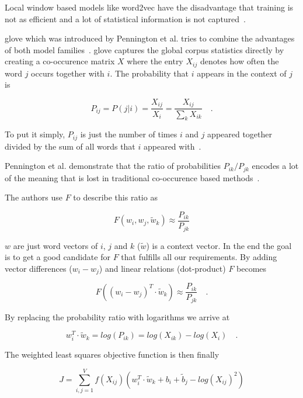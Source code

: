 Local window based models like word2vec have the disadvantage that training is not as efficient and a lot of statistical information is not captured~\cite{Pennington2014a}. 
\medskip

\gls{glove} which was introduced by Pennington et al. tries to combine the advantages of both model families~\cite{Pennington2014a}. \gls{glove} captures the global corpus statistics directly by creating a co-occurence matrix $X$ where the entry $X_{ij}$ denotes how often the word $j$ occurs together with $i$. The probability that $i$ appears in the context of $j$ is 

\begin{equation}
	P_{ij}=P(j|i)=\frac{X_{ij}}{X_i}=\frac{X_{ij}}{\sum_k X_{ik}}\quad.
\end{equation}

To put it simply, $P_{ij}$ is just the number of times $i$ and $j$ appeared together divided by the sum of all words that $i$ appeared with~\cite{Pennington2014a}.

Pennington et al. demonstrate that the ratio of probabilities $P_{ik} / P_{jk}$  encodes a lot of the meaning that is lost in traditional co-occurence based methods~\cite{Pennington2014a}.
\medskip

The authors use $F$ to describe this ratio as

\begin{equation}
	F(w_i, w_j, \widetilde{w}_k) \approx \frac{P_{ik}}{P_{jk}}
\end{equation}

$w$ are just word vectors of $i$, $j$ and $k$ {($\widetilde{w}$)} is a context vector. In the end the goal is to get a good candidate for $F$ that fulfills all our requirements. By adding vector differences {($w_i - w_j$)} and linear relations {(dot-product)} $F$ becomes

\begin{equation}
	F((w_i - w_j)^T \cdot \widetilde{w}_k) \approx \frac{P_{ik}}{P_{jk}} \quad .
\end{equation}

By replacing the probability ratio with logarithms we arrive at

\begin{equation}
	w_i^T \cdot \widetilde{w}_k = log(P_{ik}) = log(X_{ik}) - log(X_i) \quad .
\end{equation}

The weighted least squares objective function is then finally

\begin{equation}
	J = \sum_{i,j=1}^V f(X_{ij}) (w_i^T \cdot \widetilde{w}_k + b_i+\widetilde{b}_j - log(X_{ij})^2)
\end{equation}

